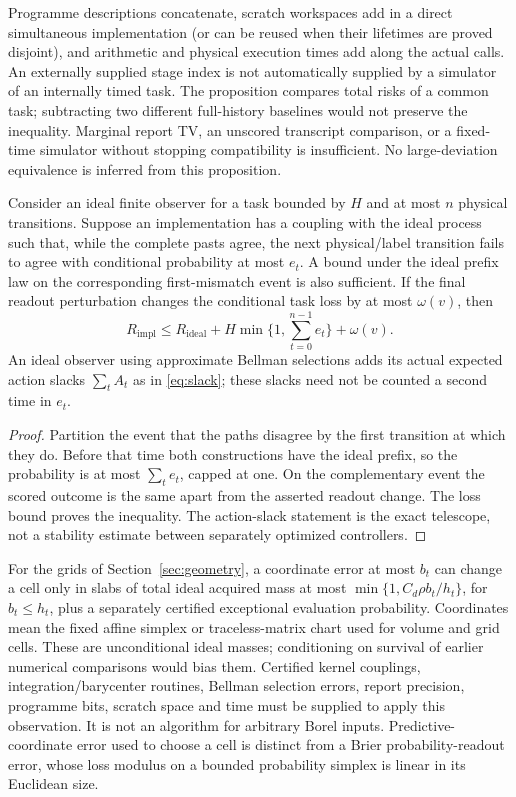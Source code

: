 Programme descriptions concatenate, scratch workspaces add in a direct simultaneous implementation (or can be reused when their lifetimes are proved disjoint), and arithmetic and physical execution times add along the actual calls. An externally supplied stage index is not automatically supplied by a simulator of an internally timed task. The proposition compares total risks of a common task; subtracting two different full-history baselines would not preserve the inequality. Marginal report TV, an unscored transcript comparison, or a fixed-time simulator without stopping compatibility is insufficient. No large-deviation equivalence is inferred from this proposition.

\begin{proposition}\label{prop:numerical}
Consider an ideal finite observer for a task bounded by $H$ and at most $n$ physical transitions. Suppose an implementation has a coupling with the ideal process such that, while the complete pasts agree, the next physical/label transition fails to agree with conditional probability at most $e_t$. A bound under the ideal prefix law on the corresponding first-mismatch event is also sufficient. If the final readout perturbation changes the conditional task loss by at most $\omega(v)$, then
\begin{equation}\label{eq:numerical}
 R_{\mathrm{impl}}\le R_{\mathrm{ideal}}
    +H\min\{1,\sum_{t=0}^{n-1}e_t\}+\omega(v).
\end{equation}
An ideal observer using approximate Bellman selections adds its actual expected action slacks $\sum_t A_t$ as in \eqref{eq:slack}; these slacks need not be counted a second time in $e_t$.
\end{proposition}
\begin{proof}
Partition the event that the paths disagree by the first transition at which they do. Before that time both constructions have the ideal prefix, so the probability is at most $\sum_te_t$, capped at one. On the complementary event the scored outcome is the same apart from the asserted readout change. The loss bound proves the inequality. The action-slack statement is the exact telescope, not a stability estimate between separately optimized controllers.
\end{proof}
For the grids of Section~\ref{sec:geometry}, a coordinate error at most $b_t$ can change a cell only in slabs of total ideal acquired mass at most
$\min\{1,C_d\rho b_t/h_t\}$, for $b_t\le h_t$, plus a separately certified exceptional evaluation probability. Coordinates mean the fixed affine simplex or traceless-matrix chart used for volume and grid cells. These are unconditional ideal masses; conditioning on survival of earlier numerical comparisons would bias them. Certified kernel couplings, integration/barycenter routines, Bellman selection errors, report precision, programme bits, scratch space and time must be supplied to apply this observation. It is not an algorithm for arbitrary Borel inputs. Predictive-coordinate error used to choose a cell is distinct from a Brier probability-readout error, whose loss modulus on a bounded probability simplex is linear in its Euclidean size.

